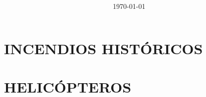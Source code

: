 \documentclass[spanish]{article}
\title{  }
\author{  }
\date{\today}
\begin{document}
\maketitle	
\pagebreak

\tableofcontents
\pagebreak



\section{INCENDIOS HISTÓRICOS}






\section{HELICÓPTEROS}








\end{document}
